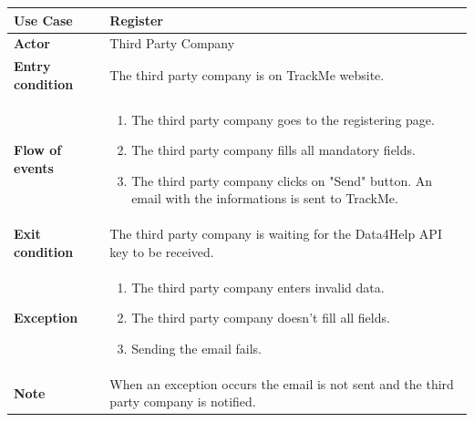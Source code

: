\documentclass[../main.tex]{subfiles}
\begin{document}
	\begin{center}
		\begin{tabular}{p{3cm}p{8.28cm}}
			\hline
			\textbf{Use Case} & Register\\
			\hline
			\textbf{Actor} & Third Party Company\\
			\hline
			\textbf{Entry condition} & The third party company is on TrackMe website.\\
			\hline
			\textbf{Flow of events} & \begin{enumerate}
				\linespread{0}\item The third party company goes to the registering page.
				\linespread{0}\item The third party company fills all mandatory fields.
				\linespread{0}\item The third party company clicks on "Send" button. An email with the informations is sent to TrackMe.
			\end{enumerate}\\
			\hline
			\textbf{Exit condition} & The third party company is waiting for the Data4Help API key to be received.\\
			\hline
			\textbf{Exception} & \begin{enumerate}
				\linespread{0}\item The third party company enters invalid data.
				\linespread{0}\item The third party company doesn't fill all fields.
				\linespread{0}\item Sending the email fails.
			\end{enumerate}\\
			\hline
			\textbf{Note} & When an exception occurs the email is not sent and the third party company is notified.\\
			\hline
		\end{tabular}
	\end{center}
	\vspace*{3cm}
\end{document}
